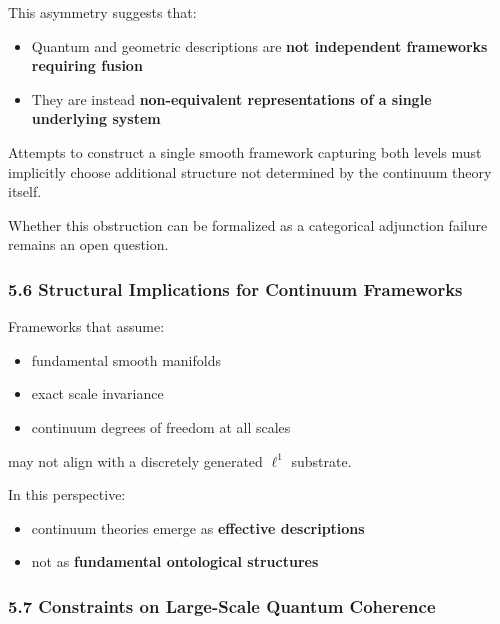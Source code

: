 \documentclass[
]{article}
\providecommand{\tightlist}{%
  \setlength{\itemsep}{0pt}\setlength{\parskip}{0pt}}
\begin{document}
This asymmetry suggests that:

\begin{itemize}
\tightlist
\item
  Quantum and geometric descriptions are \textbf{not independent
  frameworks requiring fusion}
\item
  They are instead \textbf{non-equivalent representations of a single
  underlying system}
\end{itemize}

Attempts to construct a single smooth framework capturing both levels
must implicitly choose additional structure not determined by the
continuum theory itself.

Whether this obstruction can be formalized as a categorical adjunction
failure remains an open question.

\hypertarget{structural-implications-for-continuum-frameworks}{%
\subsubsection{5.6 Structural Implications for Continuum
Frameworks}\label{structural-implications-for-continuum-frameworks}}

Frameworks that assume:

\begin{itemize}
\tightlist
\item
  fundamental smooth manifolds
\item
  exact scale invariance
\item
  continuum degrees of freedom at all scales
\end{itemize}

may not align with a discretely generated \(\ell^1\) substrate.

In this perspective:

\begin{itemize}
\tightlist
\item
  continuum theories emerge as \textbf{effective descriptions}
\item
  not as \textbf{fundamental ontological structures}
\end{itemize}

\hypertarget{constraints-on-large-scale-quantum-coherence}{%
\subsubsection{5.7 Constraints on Large-Scale Quantum
Coherence}\label{constraints-on-large-scale-quantum-coherence}}
\end{document}
